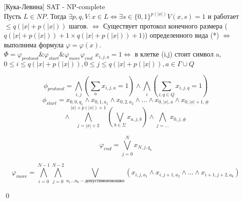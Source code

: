 	\begin{theorem}{[Кука-Левина]}
		SAT - NP-complete
		\proof \\
		Пусть $L \in NP$. Тогда $\exists p,q,V: x \in L \Leftrightarrow \exists s \in \{0,1\}^{p(|x|)}  V(x,s)=1$ и работает  $\le q(|x| + p(|x|))$ шагов.
		$ \Leftrightarrow$ Существует протокол конечного размера ($q(|x| + p(|x|)) + 1 \times q(|x| + p(|x|)) + 1)$) определенного вида (*)
		$\Leftrightarrow$ выполнима формула $\varphi = \varphi(x)$.\\
		
		$\Phi = \varphi_{protocol} \& \varphi_{start} \& \varphi_{move} \varphi_{end}$
		$x_{i,j,a} = 1 \Leftrightarrow$ в клетке (i,j) стоит символ a,\\
		$0 \le i \le q(|x| + p(|x|)), 0 \le j \le q(|x| + p(|x|)), a \in \Gamma \cup Q$
		
		$$\phi_{protocol} = \bigwedge_{i,j} (\sum_a x_{i,j,a} = 1) \wedge \bigwedge_i (\sum_{i,q \in Q}x_{i,j,q} = 1)$$
		$$\phi_{start}=x_{0,0,q_1} \wedge x_{0,1,a_1} \wedge x_{0,2,a_2} \wedge \ldots \wedge x_{0, |x|, a} \wedge x_{0,|x| + 1, \#}$$
		$$\wedge \bigwedge_{j=|x| + 2}^{|x| + p(|x|) + 1}(\bigvee_{b \in \Sigma} x_{a,j,b}) \wedge \bigwedge_{j=\ldots}x_{0,j,\#}$$
		
		$$\varphi_{end} = \bigvee_{j=0}^N x_{N,j,q_a}$$
		
		$$\varphi_{move} = \bigwedge_{i=0}^{N-1}\bigwedge_{j=0}^{N-2}\bigvee_{a_1 \ldots a_6 - допустимое окошко} (x_{i,j,a_1} \wedge x_{i,j+1,a_2} \wedge \ldots \wedge x_{i+1, j+2, a_6})$$
	\end{theorem}
	\qed